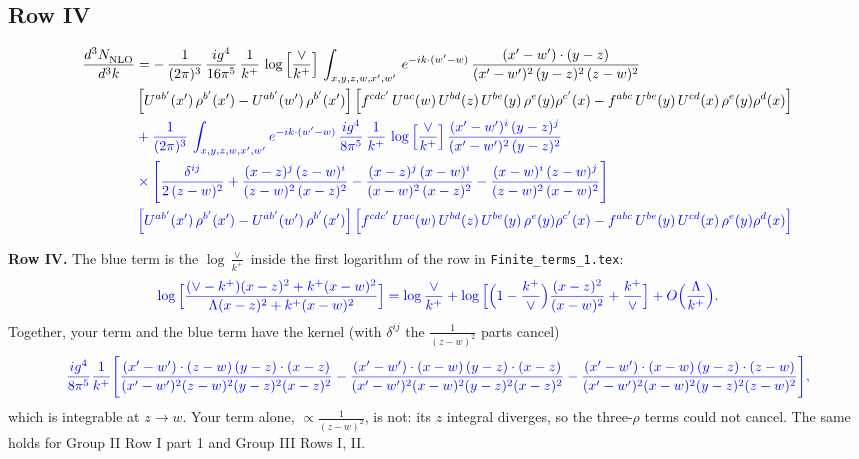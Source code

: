 \documentclass[9pt]{article}
\newcommand{\new}[1]{{\color{blue}#1}}
\newcommand{\nc}{\color{blue}}
\numberwithin{equation}{section}
\begin{document}
\subsection{Row IV}
\begin{align}
    \frac{d^{3}N_{\rm NLO}^{\rm}}{d^{3}k}  & = -\, \frac{1}{(2\pi)^{3}}\,\frac{ig^{4}}{16\pi^{5}}\,\frac{1}{k^{+}}\,\log{\left[\frac{\vee}{k^{+}}\right]}\,
    \int_{x,y,z,w,x',w'}\,e^{-ik\cdot (w^\prime-w)}\, \frac{(x'-w')\cdot (y-z)}{(x'-w')^{2}\,(y-z)^{2}\,(z-w)^{2}}\notag \\ &   \left[U^{ab'}(x')\,\rho^{b'}(x')-U^{ab'}(w')\,\rho^{b'}(x')\right] \left[f^{cdc'}\,U^{ac}(w)\,U^{bd}(z)\,U^{be}(y)\,\rho^{e}(y)\rho^{c'}(x)-f^{abc}\,U^{be}(y)\,U^{cd}(x)\,\rho^{e}(y)\rho^{d}(x)\right]
\notag \\ & \nc +\frac{1}{(2\pi)^{3}}\,\int_{x,y,z,w,x',w'}e^{-ik\cdot (w^\prime-w)}\,\frac{ig^{4}}{8\pi^{5}}\,\frac{1}{k^{+}}\,\log{\left[\frac{\vee}{k^{+}}\right]}\,\frac{(x'-w')^{i}\,(y-z)^{j}}{(x'-w')^{2}\,(y-z)^{2}}\notag \\ & \nc \times \Bigg[\frac{\delta^{ij}}{2\,(z-w)^{2}}+\frac{(x-z)^{j}\,(z-w)^{i}}{(z-w)^{2}\,(x-z)^{2}}-\frac{(x-z)^{j}\,(x-w)^{i}}{(x-w)^{2}\,(x-z)^{2}}-\frac{(x-w)^{i}\,(z-w)^{j}}{(z-w)^{2}\,(x-w)^{2}}\Bigg]\notag \\ & \nc \left[U^{ab'}(x')\,\rho^{b'}(x')-U^{ab'}(w')\,\rho^{b'}(x')\right] \left[f^{cdc'}\,U^{ac}(w)\,U^{bd}(z)\,U^{be}(y)\,\rho^{e}(y)\rho^{c'}(x)-f^{abc}\,U^{be}(y)\,U^{cd}(x)\,\rho^{e}(y)\rho^{d}(x)\right]
\end{align}

\new{\textbf{Row IV.} The blue term is the $\log\frac{\vee}{k^+}$ inside the first logarithm of the row in \texttt{Finite\_terms\_1.tex}:}
\begin{equation*}
\new{\log\Big[\frac{(\vee-k^{+})(x-z)^{2}+k^{+}(x-w)^{2}}{\Lambda(x-z)^{2}+k^{+}(x-w)^{2}}\Big]=\log\frac{\vee}{k^{+}}+\log\Big[\Big(1-\frac{k^+}{\vee}\Big)\frac{(x-z)^2}{(x-w)^2}+\frac{k^+}{\vee}\Big]+O\Big(\frac{\Lambda}{k^+}\Big).}
\end{equation*}
\new{Together, your term and the blue term have the kernel (with $\delta^{ij}$ the $\frac{1}{(z-w)^2}$ parts cancel)}
\begin{equation*}
\new{\frac{ig^4}{8\pi^5}\frac{1}{k^+}\Bigg[\frac{(x'-w')\cdot(z-w)\,(y-z)\cdot(x-z)}{(x'-w')^2(z-w)^2(y-z)^2(x-z)^2}-\frac{(x'-w')\cdot(x-w)\,(y-z)\cdot(x-z)}{(x'-w')^2(x-w)^2(y-z)^2(x-z)^2}-\frac{(x'-w')\cdot(x-w)\,(y-z)\cdot(z-w)}{(x'-w')^2(x-w)^2(y-z)^2(z-w)^2}\Bigg],}
\end{equation*}
\new{which is integrable at $z\to w$. Your term alone, $\propto\frac{1}{(z-w)^2}$, is not: its $z$ integral diverges, so the three-$\rho$ terms could not cancel. The same holds for Group II Row I part 1 and Group III Rows I, II.}
\end{document}
